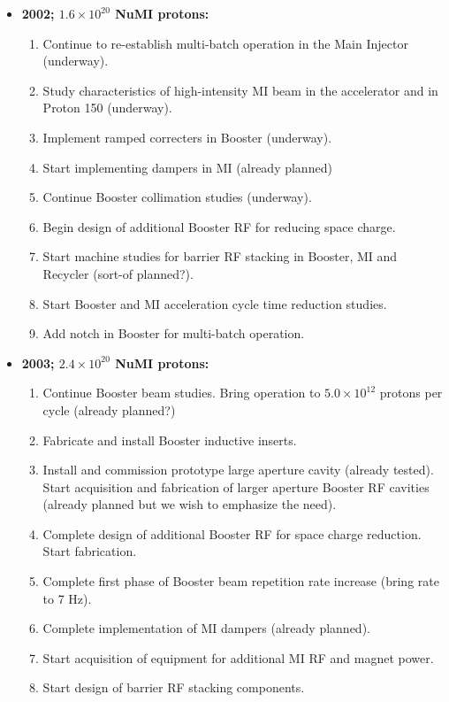 \documentclass{article}
\begin{document}
\begin {itemize}
\item {\bf 2002; $1.6 \times 10^{20}$ NuMI protons:}
  \begin {enumerate}
  \item Continue to re-establish multi-batch operation in the Main Injector
        (underway).
  \item Study characteristics of high-intensity MI beam in the accelerator and 
        in Proton 150 (underway).
  \item Implement ramped correcters in Booster (underway).
  \item Start implementing dampers in MI (already planned)
  \item Continue Booster collimation studies (underway).
  \item Begin design of additional Booster RF for reducing space charge.
  \item Start machine studies for barrier RF stacking in Booster, MI
        and Recycler (sort-of planned?).
  \item Start Booster and MI acceleration cycle time reduction studies.
  \item Add notch in Booster for multi-batch operation.
  \end {enumerate}
\item {\bf 2003; $2.4 \times 10^{20}$ NuMI protons:}
  \begin {enumerate}
  \item Continue Booster beam studies. Bring operation to $5.0 \times 10^{12}$
        protons per cycle (already planned?) 
  \item Fabricate and install Booster inductive inserts.
  \item Install and commission prototype large aperture cavity (already
        tested). Start acquisition and fabrication of larger aperture 
        Booster RF cavities (already planned but we wish to emphasize
        the need).
  \item Complete design of additional Booster RF for space charge reduction.
        Start fabrication.
  \item Complete first phase of Booster beam repetition rate increase (bring
        rate to 7 Hz).
  \item Complete implementation of MI dampers (already planned).
  \item Start acquisition of equipment for additional MI RF and magnet power.
  \item Start design of barrier RF stacking components.

\end{enumerate}
\end{itemize}
\end{document}
